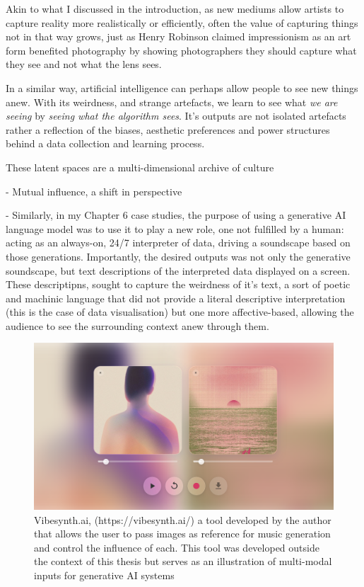 Akin to what I discussed in the introduction, as new mediums allow artists to capture reality more realistically or efficiently, often the value of capturing things not in that way grows, just as Henry Robinson claimed impressionism as an art form benefited photography by showing photographers they should capture what they see and not what the lens sees. 

In a similar way, artificial intelligence can perhaps allow people to see new things anew. With its weirdness, and strange artefacts, we learn to see what \textit{we are seeing} by \textit{seeing what the algorithm sees}. It's outputs are not isolated artefacts rather a reflection of the biases, aesthetic preferences and power structures behind a data collection and learning process. 

These latent spaces are a multi-dimensional archive of culture \cite{Schaerf2024-gf, Cetinic2022-tw, Rodriguez-Ortega2022-ak, Salvaggio2023-cv}

- Mutual influence, a shift in perspective

- Similarly, in my Chapter 6 case studies, the purpose of using a generative AI language model was to use it to play a new role, one not fulfilled by a human: acting as an always-on, 24/7 interpreter of data, driving a soundscape based on those generations. Importantly, the desired outputs was not only the generative soundscape, but text descriptions of the interpreted data displayed on a screen. These descriptipns, sought to capture the weirdness of it's text, a sort of poetic and machinic language that did not provide a literal descriptive interpretation (this is the case of data visualisation) but one more affective-based, allowing the audience to see the surrounding context anew through them. 





\begin{figure}[H]
    \centering
    \includegraphics[width=.75\linewidth]{vibesynth.png}
    \caption{Vibesynth.ai, (https://vibesynth.ai/) a tool developed by the author that allows the user to pass images as reference for music generation and control the influence of each. This tool was developed outside the context of this thesis but serves as an illustration of multi-modal inputs for generative AI systems}
    \label{fig:vibesynth}
\end{figure}

